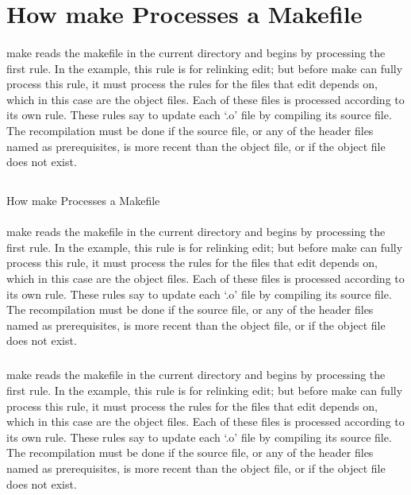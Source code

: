 \documentclass[a4paper]{article}
\begin{document}
\section{How make Processes a Makefile}
\paragraph{}

make reads the makefile in the current directory and begins by processing the first rule.
In the example, this rule is for relinking edit; but before make can fully process this rule, it must process the rules for the files that edit depends on, which in this case are the object files.
Each of these files is processed according to its own rule. 
These rules say to update each ‘.o’ file by compiling its source file. 
The recompilation must be done if the source file, or any of the header files named as prerequisites, is more recent than the object file, or if the object file does not exist.

\subsection{}
How make Processes a Makefile
\paragraph{}
make reads the makefile in the current directory and begins by processing the first rule.
In the example, this rule is for relinking edit; but before make can fully process this rule, it must process the rules for the files that edit depends on, which in this case are the object files.
Each of these files is processed according to its own rule. 
These rules say to update each ‘.o’ file by compiling its source file. 
The recompilation must be done if the source file, or any of the header files named as prerequisites, is more recent than the object file, or if the object file does not exist.

\subparagraph{}
make reads the makefile in the current directory and begins by processing the first rule.
In the example, this rule is for relinking edit; but before make can fully process this rule, it must process the rules for the files that edit depends on, which in this case are the object files.
Each of these files is processed according to its own rule. 
These rules say to update each ‘.o’ file by compiling its source file. 
The recompilation must be done if the source file, or any of the header files named as prerequisites, is more recent than the object file, or if the object file does not exist.
\end{document}
